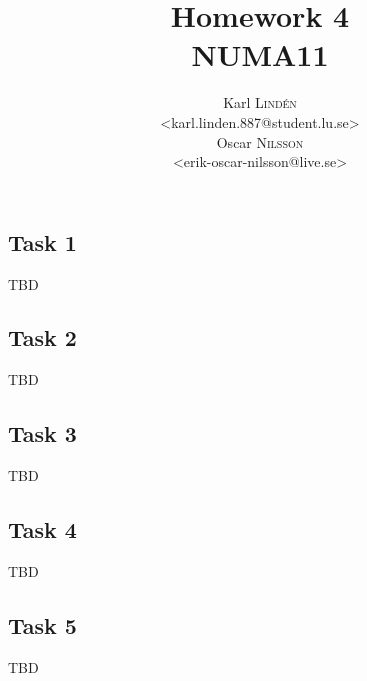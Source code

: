 \documentclass[a4paper,12pt]{article}
\begin{document}
\title{Homework 4 \\ NUMA11}
\author{
  Karl \textsc{Lind\'{e}n} \\
  <karl.linden.887@student.lu.se> \\
  Oscar \textsc{Nilsson} \\
  <erik-oscar-nilsson@live.se>
}

\maketitle
\thispagestyle{empty}

\newpage


\subsection*{Task 1}

TBD


\subsection*{Task 2}

TBD


\subsection*{Task 3}

TBD


\subsection*{Task 4}

TBD


\subsection*{Task 5}

TBD
\end{document}
